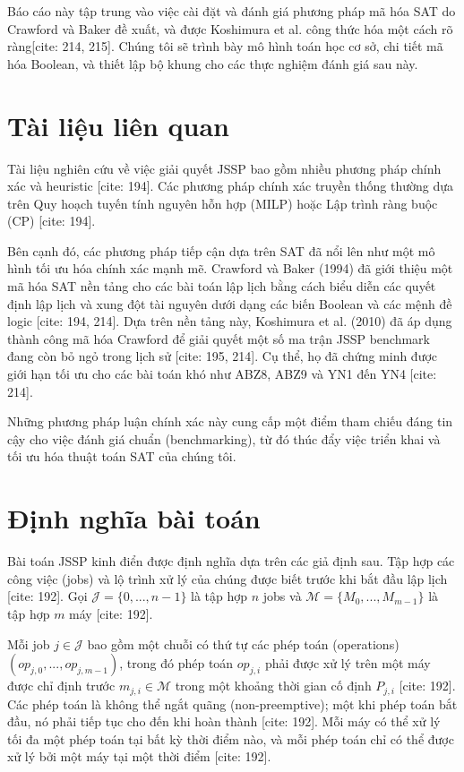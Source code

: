 \documentclass[a4paper,fleqn]{cas-sc} %
\begin{document}
Báo cáo này tập trung vào việc cài đặt và đánh giá phương pháp mã hóa SAT do Crawford và Baker đề xuất, và được Koshimura et al. \cite{koshimura2010solving} công thức hóa một cách rõ ràng[cite: 214, 215]. Chúng tôi sẽ trình bày mô hình toán học cơ sở, chi tiết mã hóa Boolean, và thiết lập bộ khung cho các thực nghiệm đánh giá sau này.

\section{Tài liệu liên quan}
Tài liệu nghiên cứu về việc giải quyết JSSP bao gồm nhiều phương pháp chính xác và heuristic \cite{nguyen2026exact}[cite: 194]. Các phương pháp chính xác truyền thống thường dựa trên Quy hoạch tuyến tính nguyên hỗn hợp (MILP) hoặc Lập trình ràng buộc (CP) \cite{nguyen2026exact}[cite: 194]. 

Bên cạnh đó, các phương pháp tiếp cận dựa trên SAT đã nổi lên như một mô hình tối ưu hóa chính xác mạnh mẽ. Crawford và Baker (1994) đã giới thiệu một mã hóa SAT nền tảng cho các bài toán lập lịch bằng cách biểu diễn các quyết định lập lịch và xung đột tài nguyên dưới dạng các biến Boolean và các mệnh đề logic \cite{nguyen2026exact}[cite: 194, 214]. Dựa trên nền tảng này, Koshimura et al. (2010) đã áp dụng thành công mã hóa Crawford để giải quyết một số ma trận JSSP benchmark đang còn bỏ ngỏ trong lịch sử \cite{nguyen2026exact}[cite: 195, 214]. Cụ thể, họ đã chứng minh được giới hạn tối ưu cho các bài toán khó như ABZ8, ABZ9 và YN1 đến YN4 \cite{koshimura2010solving}[cite: 214].

Những phương pháp luận chính xác này cung cấp một điểm tham chiếu đáng tin cậy cho việc đánh giá chuẩn (benchmarking), từ đó thúc đẩy việc triển khai và tối ưu hóa thuật toán SAT của chúng tôi.

\section{Định nghĩa bài toán}
\label{sec:problem_definition}
Bài toán JSSP kinh điển được định nghĩa dựa trên các giả định sau. Tập hợp các công việc (jobs) và lộ trình xử lý của chúng được biết trước khi bắt đầu lập lịch \cite{nguyen2026exact}[cite: 192]. Gọi $\mathcal{J} = \{0, ..., n-1\}$ là tập hợp $n$ jobs và $\mathcal{M} = \{M_0, ..., M_{m-1}\}$ là tập hợp $m$ máy \cite{nguyen2026exact}[cite: 192]. 

Mỗi job $j \in \mathcal{J}$ bao gồm một chuỗi có thứ tự các phép toán (operations) $(op_{j,0}, ..., op_{j,m-1})$, trong đó phép toán $op_{j,i}$ phải được xử lý trên một máy được chỉ định trước $m_{j,i} \in \mathcal{M}$ trong một khoảng thời gian cố định $P_{j,i}$ \cite{nguyen2026exact}[cite: 192]. Các phép toán là không thể ngắt quãng (non-preemptive); một khi phép toán bắt đầu, nó phải tiếp tục cho đến khi hoàn thành \cite{nguyen2026exact}[cite: 192]. Mỗi máy có thể xử lý tối đa một phép toán tại bất kỳ thời điểm nào, và mỗi phép toán chỉ có thể được xử lý bởi một máy tại một thời điểm \cite{nguyen2026exact}[cite: 192].
\end{document}
